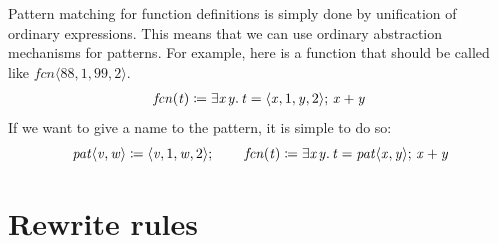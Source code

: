 \documentclass[acmsmall,review,anonymous,dvipsnames]{acmart}
\newcommand{\Varid}[1]{\mathit{#1}}
\begin{document}
Pattern matching for function definitions is simply done by unification of ordinary expressions.
This means that we can use ordinary abstraction mechanisms for patterns.
For example, here is a function that should be called like \ensuremath{\Varid{fcn}\langle\mathrm{88},\mathrm{1},\mathrm{99},\mathrm{2}\rangle}.
$$
\begin{array}{l}
\ensuremath{\Varid{fcn}(\Varid{t})\mathrel{\coloneqq}\exists\Varid{x}\hspace{0.3mm}\Varid{y}.\,\Varid{t}\mathrel{=}\langle{}\Varid{x},\mathrm{1},\Varid{y},\mathrm{2}\rangle;\,\Varid{x}\mathbin{+}\Varid{y}}
\end{array}
$$
If we want to give a name to the pattern, it is simple to do so:
$$
\ensuremath{\Varid{pat}\langle\Varid{v},\Varid{w}\rangle\mathrel{\coloneqq}\langle{}\Varid{v},\mathrm{1},\Varid{w},\mathrm{2}\rangle;\,} \quad \quad
\ensuremath{\Varid{fcn}(\Varid{t})\mathrel{\coloneqq}\exists\Varid{x}\hspace{0.3mm}\Varid{y}.\,\Varid{t}\mathrel{=}\Varid{pat}\langle\Varid{x},\Varid{y}\rangle;\,\Varid{x}\mathbin{+}\Varid{y}}
$$

\section{Rewrite rules} \label{sec:rewrite-rules}
\end{document}
